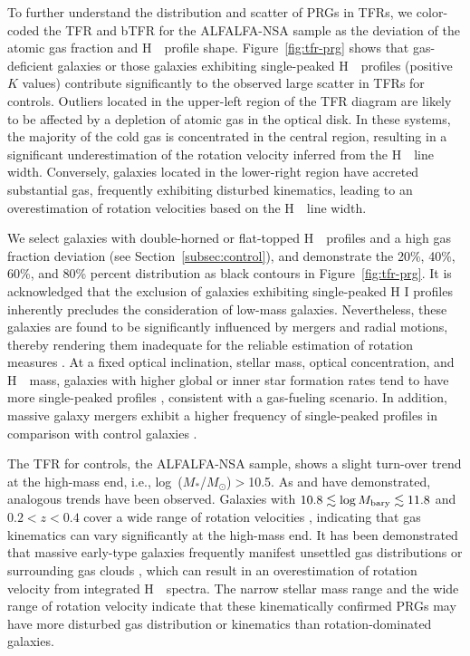 \documentclass[twocolumn]{aastex631}
\newcommand{\msun}{$M_{\mathrm{\odot}}$}
\newcommand{\mstar}{$M_{*}$}
\def\HI{H\,  {\textsc{\romannumeral 1}}}
\begin{document}
To further understand the distribution and scatter of PRGs in TFRs, we color-coded the TFR and bTFR for the ALFALFA-NSA sample as the deviation of the atomic gas fraction and \HI\ profile shape. Figure~\ref{fig:tfr-prg} shows that gas-deficient galaxies or those galaxies exhibiting single-peaked \HI\ profiles (positive $K$ values) contribute significantly to the observed large scatter in TFRs for controls. Outliers located in the upper-left region of the TFR diagram are likely to be affected by a depletion of atomic gas in the optical disk. In these systems, the majority of the cold gas is concentrated in the central region, resulting in a significant underestimation of the rotation velocity inferred from the \HI\ line width. Conversely, galaxies located in the lower-right region have accreted substantial gas, frequently exhibiting disturbed kinematics, leading to an overestimation of rotation velocities based on the \HI\ line width.

We select galaxies with double-horned or flat-topped \HI\ profiles and a high gas fraction deviation (see Section~\ref{subsec:control}), and demonstrate the 20\%, 40\%, 60\%, and 80\% percent distribution as black contours in Figure~\ref{fig:tfr-prg}. It is acknowledged that the exclusion of galaxies exhibiting single-peaked H I profiles inherently precludes the consideration of low-mass galaxies. Nevertheless, these galaxies are found to be significantly influenced by mergers and radial motions, thereby rendering them inadequate for the reliable estimation of rotation measures \citep{Downing2023MNRAS.522.3318D}. At a fixed optical inclination, stellar mass, optical concentration, and \HI\ mass, galaxies with higher global or inner star formation rates tend to have more single-peaked profiles \citep{Yu2022ApJ...930...85Y}, consistent with a gas-fueling scenario. In addition, massive galaxy mergers exhibit a higher frequency of single-peaked profiles in comparison with control galaxies \citep{Zuo2022ApJ...929...15Z}.

The TFR for controls, the ALFALFA-NSA sample, shows a slight turn-over trend at the high-mass end, i.e., log~(\mstar/\msun)$>$10.5. As \citet{Peletier1993ApJ...418..626P} and \citet{Noordermeer2007MNRAS.381.1463N} have demonstrated, analogous trends have been observed. Galaxies with $10.8 \lesssim \log M_{\rm bary} \lesssim 11.8$ and $0.2 < z < 0.4$ cover a wide range of rotation velocities \citep{Catinella2015MNRAS.446.3526C, Jarvis2025arXiv250611935J}, indicating that gas kinematics can vary significantly at the high-mass end. It has been demonstrated that massive early-type galaxies frequently manifest unsettled gas distributions or surrounding gas clouds \citep{Serra2012MNRAS.422.1835S}, which can result in an overestimation of rotation velocity from integrated \HI\ spectra. The narrow stellar mass range and the wide range of rotation velocity indicate that these kinematically confirmed PRGs may have more disturbed gas distribution or kinematics than rotation-dominated galaxies.
\end{document}
